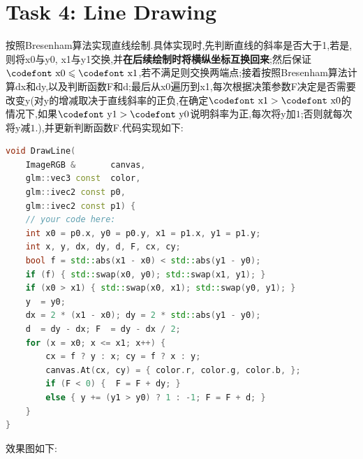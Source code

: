\documentclass{ctexart}
\begin{document}
\section*{Task 4: Line Drawing}
按照Bresenham算法实现直线绘制.具体实现时,先判断直线的斜率是否大于1,若是,则将{\codefont x0}与{\codefont y0}, {\codefont x1}与{\codefont y1}交换,并\textbf{在后续绘制时将横纵坐标互换回来};然后保证$\text{\codefont x0}\leqslant\text{\codefont x1}$,若不满足则交换两端点;接着按照Bresenham算法计算{\codefont dx}和{\codefont dy},以及判断函数{\codefont F}和{\codefont d};最后从{\codefont x0}遍历到{\codefont x1},每次根据决策参数{\codefont F}决定是否需要改变{\codefont y}(对{\codefont y}的增减取决于直线斜率的正负,在确定$\text{\codefont x1}>\text{\codefont x0}$的情况下,如果$\text{\codefont y1}>\text{\codefont y0}$说明斜率为正,每次将{\codefont y}加$1$;否则就每次将{\codefont y}减$1$.),并更新判断函数{\codefont F}.代码实现如下:
\begin{lstlisting}[language=C++]
    void DrawLine(
    ImageRGB &       canvas,
    glm::vec3 const  color,
    glm::ivec2 const p0,
    glm::ivec2 const p1) {
    // your code here:
    int x0 = p0.x, y0 = p0.y, x1 = p1.x, y1 = p1.y;
    int x, y, dx, dy, d, F, cx, cy;
    bool f = std::abs(x1 - x0) < std::abs(y1 - y0);
    if (f) { std::swap(x0, y0); std::swap(x1, y1); }
    if (x0 > x1) { std::swap(x0, x1); std::swap(y0, y1); }
    y  = y0; 
    dx = 2 * (x1 - x0); dy = 2 * std::abs(y1 - y0);
    d  = dy - dx; F  = dy - dx / 2;
    for (x = x0; x <= x1; x++) {
        cx = f ? y : x; cy = f ? x : y;
        canvas.At(cx, cy) = { color.r, color.g, color.b, };
        if (F < 0) {  F = F + dy; } 
        else { y += (y1 > y0) ? 1 : -1; F = F + d; }
    }
}
\end{lstlisting}
效果图如下:
\end{document}
